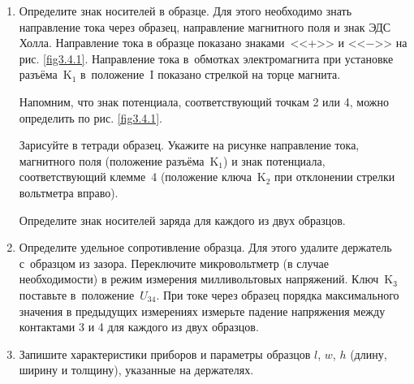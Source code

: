 \begin{enumerate}
\item{Определите знак носителей в образце. Для этого необходимо знать направление тока через образец, направление магнитного поля и знак ЭДС Холла. Направление тока в образце показано знаками~<<+>> и <<$-$>> на рис. \ref{fig3.4.1}. Направление тока в~обмотках электромагнита при установке разъёма~K$_1$ в~положение~I показано стрелкой на торце магнита.

Напомним, что знак потенциала, соответствующий точкам 2 или 4, можно определить по рис. \ref{fig3.4.1}.

Зарисуйте в тетради образец. Укажите на рисунке направление тока, магнитного поля (положение разъёма~K$_1$) и знак
потенциала, соответствующий клемме~4 (положение ключа~K$_2$ при отклонении стрелки вольтметра вправо).

Определите знак носителей заряда для каждого из двух образцов.
}
\item{Определите удельное сопротивление образца. Для этого удалите держатель с~образцом из зазора. Переключите микровольтметр (в случае необходимости) в  режим измерения милливольтовых напряжений. Ключ~K$_3$ поставьте в~положение~$U_{34}$. При токе через образец порядка максимального значения в предыдущих измерениях измерьте падение напряжения между контактами 3 и 4 для каждого из двух образцов.}

\item{ Запишите характеристики приборов и параметры образцов $l$, $w$, $h$ (длину, ширину и толщину), указанные на держателях.}
\end{enumerate}

